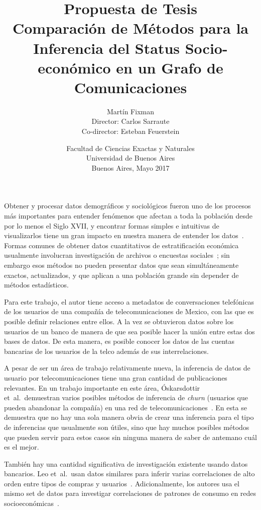 \documentclass{article}
\title{Propuesta de Tesis\\\vspace{1em}\Large 
Comparación de Métodos para la Inferencia
del Status Socio-económico en un Grafo de Comunicaciones}
\author{{\Large Martín Fixman}\\Director: Carlos Sarraute\\Co-director: Esteban Feuerstein}
\date{{Facultad de Ciencias Exactas y Naturales}\\{Universidad de Buenos Aires}\\Buenos Aires, Mayo 2017}
\begin{document}
\maketitle

\section*{}

Obtener y procesar datos demográficos y sociológicos fueron uno de los procesos más importantes para entender fenómenos que afectan a toda la población desde por lo menos el Siglo XVII, y encontrar formas simples e intuitivas de visualizarlos tiene un gran impacto en nuestra manera de entender los datos~\citep{minard1844,snow1855}. Formas comunes de obtener datos cuantitativos de estratificación económica usualmente involucran investigación de archivos o encuestas sociales~\citep{bulmer1977}; sin embargo esos métodos no pueden presentar datos que sean simultáneamente exactos, actualizados, y que aplican a una población grande sin depender de métodos estadísticos.

Para este trabajo, el autor tiene acceso a metadatos de conversaciones telefónicas de los usuarios de una compañía de telecomunicaciones de Mexico, con las que es posible definir relaciones entre ellos. A la vez se obtuvieron datos sobre los usuarios de un banco de manera de que sea posible hacer la unión entre estas dos bases de datos. De esta manera, es posible conocer los datos de las cuentas bancarias de los usuarios de la telco además de sus interrelaciones.

A pesar de ser un área de trabajo relativamente nueva, la inferencia de datos de usuario por telecomunicaciones tiene una gran cantidad de publicaciones relevantes. En un trabajo importante en este área, Óskarsdottir et~al.\ demuestran varios posibles métodos de inferencia de \emph{churn} (usuarios que pueden abandonar la compañía) en una red de telecomunicaciones~\cite{oskarsdottir2016}. En esta se demuestra que no hay una sola manera obvia de crear una inferencia para el tipo de inferencias que usualmente son útiles, sino que hay muchos posibles métodos que pueden servir para estos casos sin ninguna manera de saber de antemano cuál es el mejor.

También hay una cantidad significativa de investigación existente usando datos bancarios. Leo et~al.\ usan datos similares para inferir varias correlaciones de alto orden entre tipos de compras y usuarios~\cite{leo2015socioeconomic}. Adicionalmente, los autores usa el mismo set de datos para investigar correlaciones de patrones de consumo en redes socioeconómicas~\cite{leo16correlations}.
\end{document}
